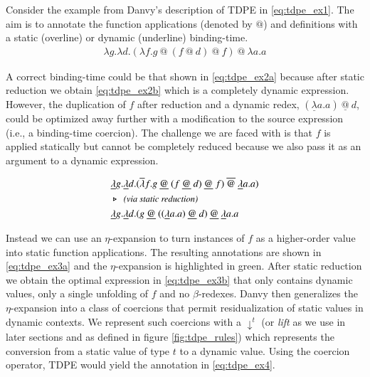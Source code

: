 \documentclass[a4paper,12pt,twoside,openright]{report}
\theoremstyle{definition}
\begin{document}
Consider the example from Danvy's description of TDPE \cite{danvy1999type} in \eqref{eq:tdpe_ex1}. The aim is to annotate the function applications (denoted by $@$) and definitions with a static (overline) or dynamic (underline) binding-time.
\begin{align}
    \lambda g.\lambda d.(\lambda f.g \:@ \: (f \: @ \: d)\: @ \:f) \: @ \: \lambda a.a \label{eq:tdpe_ex1}
\end{align}

A correct binding-time could be that shown in \eqref{eq:tdpe_ex2a} because after static reduction we obtain \eqref{eq:tdpe_ex2b} which is a completely dynamic expression. However, the duplication of $f$ after reduction and a dynamic redex, $(\underline{\lambda}a.a) \: \underline{@} \: d$, could be optimized away further with a modification to the source expression (i.e., a binding-time coercion). The challenge we are faced with is that $f$ is applied statically but cannot be completely reduced because we also pass it as an argument to a dynamic expression.
\begin{figure}[hbp!]
    \begin{align}
        & \underline{\lambda}g.\underline{\lambda} d.(\overline{\lambda} f.g \: \underline{@} \: (f \: \underline{@} \: d) \: \underline{@} \: f) \: \overline{@} \: \underline{\lambda} a.a) \label{eq:tdpe_ex2a} \\
        & \triangleright \:\: \emph{\small{\text{(via static reduction)}}} \nonumber \\
        & \underline{\lambda}g.\underline{\lambda} d.(g \: \underline{@} \: ((\underline{\lambda} a.a) \: \underline{@} \: d) \: \underline{@} \: \underline{\lambda} a.a \label{eq:tdpe_ex2b}
    \end{align}
\end{figure}

Instead we can use an $\eta$-expansion to turn instances of $f$ as a higher-order value into static function applications. The resulting annotations are shown in \eqref{eq:tdpe_ex3a} and the $\eta$-expansion is highlighted in green. After static reduction we obtain the optimal expression in \eqref{eq:tdpe_ex3b} that only contains dynamic values, only a single unfolding of $f$ and no $\beta$-redexes. Danvy then generalizes the $\eta$-expansion into a class of coercions that permit residualization of static values in dynamic contexts. We represent such coercions with a $\downarrow^t$ (or \textit{lift} as we use in later sections and as defined in figure \ref{fig:tdpe_rules}) which represents the conversion from a static value of type $t$ to a dynamic value. Using the coercion operator, TDPE would yield the annotation in \eqref{eq:tdpe_ex4}.
\end{document}
